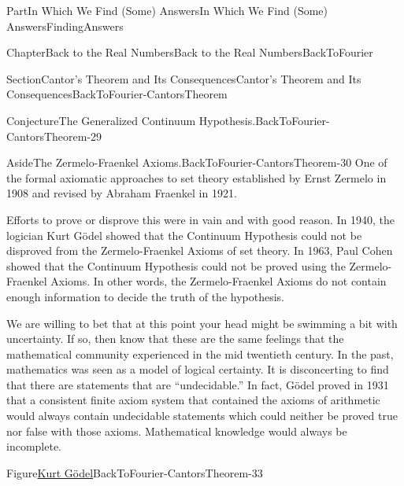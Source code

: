 \documentclass[oneside,10pt,]{book}
\numberwithin{equation}{part}
\begin{document}
\begin{partptx}{Part}{In Which We Find (Some) Answers}{}{In Which We Find (Some) Answers}{}{}{FindingAnswers}
\begin{chapterptx}{Chapter}{Back to the Real Numbers}{}{Back to the Real Numbers}{}{}{BackToFourier}
\begin{sectionptx}{Section}{Cantor's Theorem and Its Consequences}{}{Cantor's Theorem and Its Consequences}{}{}{BackToFourier-CantorsTheorem}
\begin{conjecture}{Conjecture}{The Generalized Continuum Hypothesis.}{}{BackToFourier-CantorsTheorem-29}
\end{conjecture}
\begin{aside}{Aside}{The Zermelo-Fraenkel Axioms.}{BackToFourier-CantorsTheorem-30}%
One of the formal axiomatic approaches to set theory established by Ernst Zermelo in 1908 and revised by Abraham Fraenkel in 1921.%
\end{aside}
Efforts to prove or disprove this were in vain and with good reason.  In 1940, the logician Kurt Gödel showed that the Continuum Hypothesis could not be disproved from the Zermelo-Fraenkel Axioms of set theory.  In 1963, Paul Cohen showed that the Continuum Hypothesis could not be proved using the Zermelo-Fraenkel Axioms.  In other words, the Zermelo-Fraenkel Axioms do not contain enough information to decide the truth of the hypothesis.%
\par
We are willing to bet that at this point your head might be swimming a bit with uncertainty.  If so, then know that these are the same feelings that the mathematical community experienced in the mid twentieth century.  In the past, mathematics was seen as a model of logical certainty.  It is disconcerting to find that there are statements that are ``undecidable.'' In fact, Gödel proved in 1931 that a consistent finite axiom system that contained the axioms of arithmetic would always contain undecidable statements which could neither be proved true nor false with those axioms. Mathematical knowledge would always be incomplete.%
\begin{figureptx}{Figure}{\href{https://mathshistory.st-andrews.ac.uk/Biographies/Godel/}{Kurt Gödel}\protect\footnotemark{}}{BackToFourier-CantorsTheorem-33}{}%
%
\begin{image}{0.325}{0.35}{0.325}{}%

\end{image}
\end{figureptx}
\end{sectionptx}
\end{chapterptx}
\end{partptx}
\end{document}

